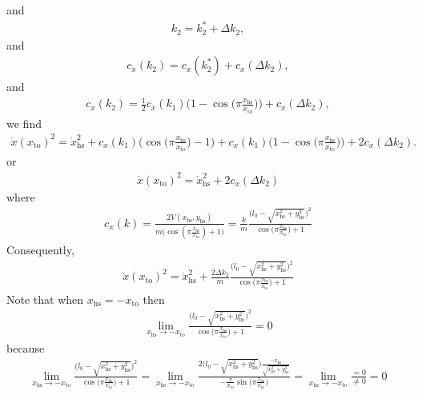 \documentclass[journal,12pt,onecolumn]{IEEEtran}
\begin{document}
and 
\begin{align}
	k_2 = k_2^*+ \Delta k_2,
\end{align}
and
\begin{align}
c_x(k_2) = c_x(k_2^*) + c_x(\Delta k_2),
\end{align}
and
\begin{align}
	c_x(k_2) = \frac{1}{2} c_x(k_1) \Big(1-\cos\big(\pi \frac{x_{\text{hs}}}{x_{\text{to}}} \big)\Big) +
	 c_x(\Delta k_2),
\end{align}
we find
\begin{align}
	\dot{x}(x_\text{to})^2 = \dot{x}_{\text{hs}}^2 + c_x(k_1)\Big(\cos\big(\pi \frac{x_{\text{hs}}}{x_{\text{to}}} \big) -1\Big) + c_x(k_1) \Big(1-\cos\big(\pi \frac{x_{\text{hs}}}{x_{\text{to}}} \big)\Big) + 2 c_x(\Delta k_2).
\end{align}
or
\begin{align}
	\dot{x}(x_\text{to})^2 = \dot{x}_{\text{hs}}^2 +  2 c_x(\Delta k_2)
\end{align}
where
\begin{align}
	c_x(k) =  \frac{2V(x_\text{hs},y_\text{hs})}{m\Big(\cos(\pi \frac{x_{\text{hs}}}{x_{\text{to}}})+1 \Big)} = \frac{k}{m}\frac{\Big(l_0 - \sqrt{x_\text{hs}^2+y_\text{hs}^2}\Big)^2}{ \cos\big(\pi \frac{x_\text{hs}}{x_\text{to}}\big)+1}
\end{align}
Consequently,
\begin{align}
	\dot{x}(x_\text{to})^2 = \dot{x}_{\text{hs}}^2 +  \frac{2 \Delta k_2}{m}\frac{\Big(l_0 - \sqrt{x_\text{hs}^2+y_\text{hs}^2}\Big)^2}{ \cos\big(\pi \frac{x_\text{hs}}{x_\text{to}}\big)+1}
\end{align}
Note that when $x_{\text{hs}}=-x_{\text{to}}$ then
\begin{align}
	\lim_{x_{\text{hs}} \rightarrow -x_{\text{to}}}\frac{\Big(l_0 - \sqrt{x_\text{hs}^2+y_\text{hs}^2}\Big)^2}{ \cos\big(\pi \frac{x_\text{hs}}{x_\text{to}}\big)+1} = 0
\end{align}
because
\begin{align}
	\lim_{x_{\text{hs}} \rightarrow -x_{\text{to}}}\frac{\Big(l_0 - \sqrt{x_\text{hs}^2+y_\text{hs}^2}\Big)^2}{ \cos\big(\pi \frac{x_\text{hs}}{x_\text{to}}\big)+1} = \lim_{x_{\text{hs}} \rightarrow -x_{\text{to}}} 
	\frac{2\Big(l_0 - \sqrt{x_\text{hs}^2+y_\text{hs}^2}\Big) \frac{-x_\text{hs}}{ \sqrt{x_\text{hs}^2+y_\text{hs}^2}}}{ -\frac{\pi}{x_{\text{to}}}\sin\big(\pi \frac{x_\text{hs}}{x_\text{to}}\big)} = 
	\lim_{x_{\text{hs}} \rightarrow -x_{\text{to}}} 
	\frac{=0}{\neq 0}=0
\end{align}
\end{document}
